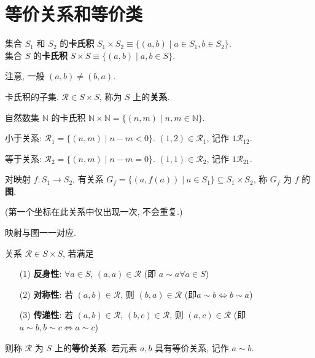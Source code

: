 \documentclass{note}
\begin{document}
\section{等价关系和等价类}
\begin{df}[卡氏积]
    集合 $S_1$ 和 $S_2$ 的\textbf{卡氏积} $S_1\times S_2\equiv\{(a,b)\mid a\in S_1,b\in S_2\}$.\\
    集合 $S$ 的\textbf{卡氏积} $S\times S\equiv\{(a,b)\mid a,b\in S\}$.
\end{df}
注意, 一般 $(a,b)\neq (b,a)$.

\begin{df}[关系]
    卡氏积的子集. $\mathcal{R}\in S\times S$, 称为 $S$ 上的\textbf{关系}.
\end{df}

\begin{eg}
    自然数集 $\mathbb{N}$ 的卡氏积 $\mathbb{N}\times\mathbb{N}=\{(n,m)\mid n,m\in\mathbb{N}\}$.

    小于关系: $\mathcal{R}_1=\{(n,m)\mid n-m<0\}$. $(1,2)\in\mathcal{R}_1$, 记作 $1\mathcal{R}_12$.

    等于关系: $\mathcal{R}_2=\{(n,m)\mid n-m=0\}$. $(1,1)\in \mathcal{R}_2$, 记作 $1\mathcal{R}_21$.
\end{eg}

\begin{df}[图]
    对映射 $f:S_1\rightarrow S_2$, 有关系 $G_f=\{(a,f(a))\mid a\in S_1\}\subseteq S_1\times S_2$, 称 $G_f$ 为 $f$ 的\textbf{图}.
\end{df}
(第一个坐标在此关系中仅出现一次, 不会重复.)

映射与图一一对应.

\begin{df}[等价关系]
    关系 $\mathcal{R}\in S\times S$, 若满足
    \begin{itemize}
        \item[(1)] \textbf{反身性}: $\forall a\in S$, $(a,a)\in\mathcal{R}$ (即 $a\sim a\forall a\in S$)
        \item[(2)] \textbf{对称性}: 若 $(a,b)\in\mathcal{R}$, 则 $(b,a)\in\mathcal{R}$ (即$a\sim b\Longleftrightarrow b\sim a$)
        \item[(3)] \textbf{传递性}: 若 $(a,b)\in\mathcal{R}$, $(b,c)\in\mathcal{R}$, 则 $(a,c)\in\mathcal{R}$ (即$a\sim b,b\sim c\Longleftrightarrow a\sim c$)
    \end{itemize}
    则称 $\mathcal{R}$ 为 $S$ 上的\textbf{等价关系}. 若元素 $a,b$ 具有等价关系, 记作 $a\sim b$.
\end{df}
\end{document}
